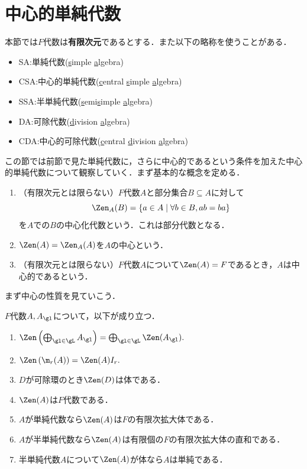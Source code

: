 \documentclass[a4paper,11pt]{jsarticle}
\begin{document}
\setcounter{section}{18}
\section{中心的単純代数}
\begin{rmk}
  本節では$F$代数は\textbf{有限次元}であるとする．また以下の略称を使うことがある．
  \begin{itemize}
    \item SA:単純代数(\underline{s}imple \underline{a}lgebra)
    \item CSA:中心的単純代数(\underline{c}entral \underline{s}imple \underline{a}lgebra)
    \item SSA:半単純代数(\underline{s}emi\underline{s}imple \underline{a}lgebra)
    \item DA:可除代数(\underline{d}ivision \underline{a}lgebra)
    \item CDA:中心的可除代数(\underline{c}entral \underline{d}ivision \underline{a}lgebra)
  \end{itemize}
\end{rmk}
この節では前節で見た単純代数に，さらに中心的であるという条件を加えた中心的単純代数について観察していく．まず基本的な概念を定める．
\begin{dfn}[中心的単純代数]
  \begin{enumerate}
    \item （有限次元とは限らない）$F$代数$A$と部分集合$B\subseteq A$に対して
          \[
            \Zen_A(B)=\{a\in A\mid \forall b\in B, ab=ba\}
          \]
          を$A$での$B$の中心化代数という．これは部分代数となる．
    \item $\Zen(A)=\Zen_A(A)$を$A$の中心という．
    \item （有限次元とは限らない）$F$代数$A$について$\Zen(A)=F$であるとき，$A$は中心的であるという．
  \end{enumerate}
\end{dfn}
まず中心の性質を見ていこう．
\begin{prop}[中心の性質]\label{prop:prop_of_center}
  $F$代数$A,A_\gl$について，以下が成り立つ．
  \begin{enumerate}
    \item $\Zen\left(\bigoplus_{\gl\in\gL}A_{\gl}\right)=\bigoplus_{\gl\in\gL}\Zen(A_{\gl}).$
    \item $\Zen\left(\m_r(A)\right)=\Zen(A)I_r.$
    \item $D$が可除環のとき$\Zen(D)$は体である．
    \item $\Zen(A)$は$F$代数である．
    \item $A$が単純代数なら$\Zen(A)$は$F$の有限次拡大体である．
    \item $A$が半単純代数なら$\Zen(A)$は有限個の$F$の有限次拡大体の直和である．
    \item 半単純代数$A$について$\Zen(A)$が体なら$A$は単純である．
  \end{enumerate}
\end{prop}
\end{document}
